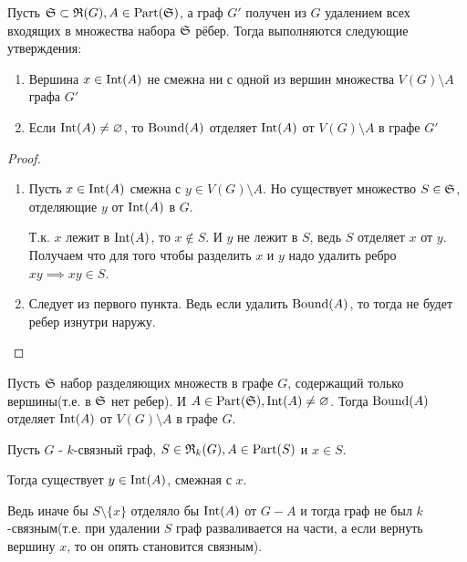 \begin{customthm}{0.1} \label{theorem:0_1}
	Пусть $\S \subset \R(G), A \in \Part(\S)$, а граф  $G'$ получен из  $G$ удалением всех входящих в множества набора  $\S$ рёбер.
	Тогда выполняются следующие утверждения:
	 \begin{enumerate}
		 \item Вершина $x \in \Int(A)$ не смежна ни с одной из вершин множества  $V(G) \setminus A$ графа  $G'$
		\item Если  $\Int(A) \neq \varnothing$, то  $\Bound(A)$ отделяет  $\Int(A)$ от $V(G) \setminus A$ в графе  $G'$
	\end{enumerate}
\end{customthm}
\begin{proof}
	\begin{enumerate}
		\item Пусть $x \in \Int(A)$ смежна с  $y \in V(G) \setminus A$.
			Но существует множество  $S \in \S$, отделяющие  $y$ от  $\Int(A)$ в  $G$.

			Т.к. $x$ лежит в $\Int(A)$, то  $x \not \in S$.
			И $y$ не лежит в  $S$, ведь  $S$ отделяет  $x$ от  $y$.
			Получаем что для того чтобы разделить $x$ и  $y$ надо удалить ребро  $xy \implies xy \in S$.

		\item Следует из первого пункта. Ведь если удалить $\Bound(A)$, то тогда не будет ребер изнутри наружу.
	\end{enumerate}
\end{proof}

\begin{customcrly}{1}\label{corollary:0_1}
	Пусть $\S$ набор разделяющих множеств в графе  $G$, содержащий только вершины(т.е. в $\S$ нет ребер).
	И $A \in \Part(\S), \Int(A) \neq \varnothing$.
	Тогда  $\Bound(A)$ отделяет $\Int(A)$ от $V(G) \setminus A$ в графе  $G$.
\end{customcrly}

\begin{remrk} \label{remark:0_inside_connected_with_bound}
	Пусть $G$ - $k$-связный граф, $S \in \R_k(G), A \in \Part(S)$ и $x \in S$.

	Тогда существует $y \in \Int(A)$, смежная с $x$.

	Ведь иначе бы $S \setminus \{x\}$ отделяло бы  $\Int(A)$ от $G - A$ и тогда граф не был $k$-связным(т.е. при удалении $S$ граф разваливается на части, а если вернуть вершину $x$, то он опять становится связным).
\end{remrk}

